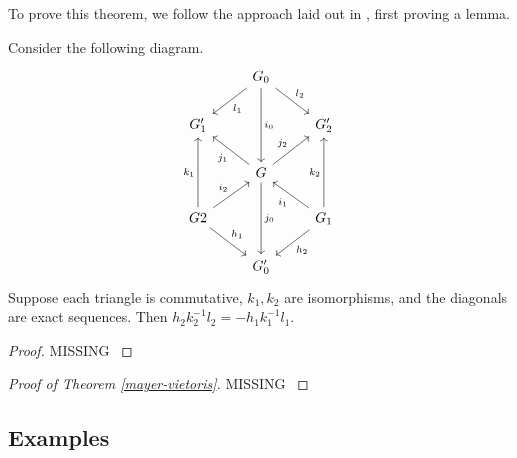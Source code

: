 To prove this theorem, we follow the approach laid out in \cite{Eilenberg}, first proving a lemma. 

\begin{lemma}\label{mayer-vietoris-lemma}
Consider the following diagram.
\[\begin{tikzcd}
                                                         & G_0 \arrow[ld, "l_1"] \arrow[rd, "l_2"] \arrow[dd, "i_0"] &                                                           \\
G_1'                                                     &                                                           & G_2'                                                      \\
                                                         & G \arrow[dd, "j_0"] \arrow[lu, "j_1"] \arrow[ru, "j_2"]   &                                                           \\
G2 \arrow[rd, "h_1"] \arrow[ru, "i_2"] \arrow[uu, "k_1"] &                                                           & G_1 \arrow[ld, "h_2"] \arrow[lu, "i_1"] \arrow[uu, "k_2"] \\
                                                         & G_0'                                                      &                                                          
\end{tikzcd}\]
Suppose each triangle is commutative, $k_1,k_2$ are isomorphisms, and the diagonals are exact sequences. Then $h_2k_2^{-1}l_2=-h_1k_1^{-1}l_1$.
\end{lemma}

\begin{proof}
MISSING
\cite{Eilenberg}
\end{proof}


\begin{proof}[Proof of Theorem \ref{mayer-vietoris}]

MISSING \cite{Eilenberg}
\end{proof}
\subsection{Examples}

